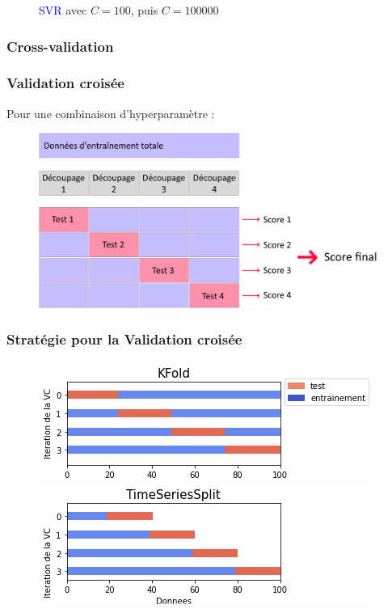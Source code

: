 \documentclass{beamer}[aspectratio = 43]
\begin{document}
\begin{frame}
\begin{figure}[h]
\begin{minipage}{0.5\textwidth}
		\end{minipage}
		\caption{\textcolor{blue}{SVR} avec $C=100$, puis $C=100000$}
	\end{figure}
\end{frame}

\subsubsection*{Cross-validation}
\begin{frame}
	\frametitle{Validation croisée}
	Pour une combinaison d'hyperparamètre :
	\begin{figure}[h]
		\centering
		\includegraphics[scale=0.25]{VC}
	\end{figure}
\end{frame}

\begin{frame}
	\frametitle{Stratégie pour la Validation croisée}
		\begin{figure}[h]
			\centering
			\includegraphics[scale=0.7]{kfold_}
			\includegraphics[scale=0.7]{tscv_}
		\end{figure}
\end{frame}
\end{document}
